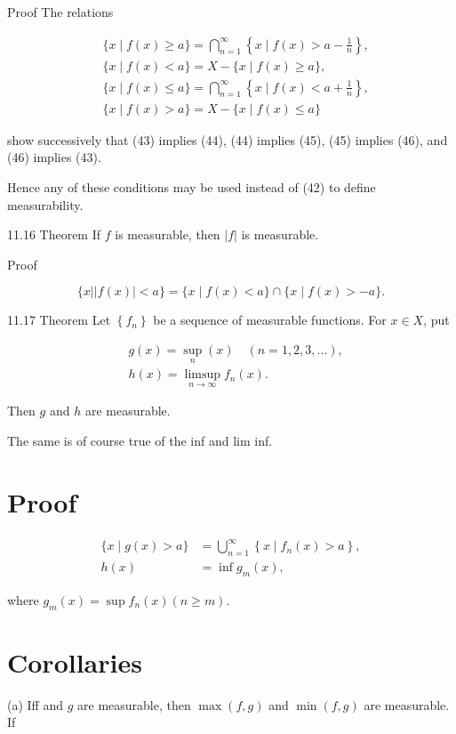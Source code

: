 \documentclass[10pt]{article}
\begin{document}
Proof The relations

$$
\begin{aligned}
& \{x \mid f(x) \geq a\}=\bigcap_{n=1}^{\infty}\left\{x \mid f(x)>a-\frac{1}{n}\right\}, \\
& \{x \mid f(x)<a\}=X-\{x \mid f(x) \geq a\}, \\
& \{x \mid f(x) \leq a\}=\bigcap_{n=1}^{\infty}\left\{x \mid f(x)<a+\frac{1}{n}\right\}, \\
& \{x \mid f(x)>a\}=X-\{x \mid f(x) \leq a\}
\end{aligned}
$$

show successively that (43) implies (44), (44) implies (45), (45) implies (46), and (46) implies (43).

Hence any of these conditions may be used instead of (42) to define measurability.

11.16 Theorem If $f$ is measurable, then $|f|$ is measurable.

Proof

$$
\{x|| f(x) \mid<a\}=\{x \mid f(x)<a\} \cap\{x \mid f(x)>-a\} .
$$

11.17 Theorem Let $\left\{f_{n}\right\}$ be a sequence of measurable functions. For $x \in X$, put

$$
\begin{aligned}
& g(x)=\sup _{n}(x) \quad(n=1,2,3, \ldots), \\
& h(x)=\limsup _{n \rightarrow \infty} f_{n}(x) .
\end{aligned}
$$

Then $g$ and $h$ are measurable.

The same is of course true of the inf and lim inf.

\section{Proof}
$$
\begin{aligned}
\{x \mid g(x)>a\} & =\bigcup_{n=1}^{\infty}\left\{x \mid f_{n}(x)>a\right\}, \\
h(x) & =\inf g_{m}(x),
\end{aligned}
$$

where $g_{m}(x)=\sup f_{n}(x)(n \geq m)$.

\section{Corollaries}
(a) Iff and $g$ are measurable, then $\max (f, g)$ and $\min (f, g)$ are measurable. If
\end{document}
